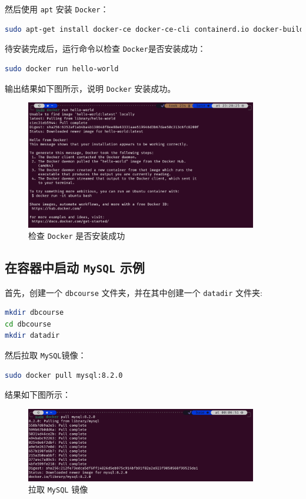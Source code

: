 \documentclass{article}
\begin{document}
然后使用 \texttt{apt} 安装 \texttt{Docker}：

\begin{lstlisting}[language=bash]
sudo apt-get install docker-ce docker-ce-cli containerd.io docker-buildx-plugin docker-compose-plugin
\end{lstlisting}

待安装完成后，运行命令以检查 \texttt{Docker}是否安装成功：

\begin{lstlisting}[language=bash]
sudo docker run hello-world
\end{lstlisting}

输出结果如下图所示，说明 \texttt{Docker} 安装成功。

\begin{figure}[H]
  \centering
  \includegraphics[width=0.9\textwidth]{img/1.png}
  \caption{检查 \texttt{Docker} 是否安装成功}
\end{figure}

\subsection{在容器中启动 \texttt{MySQL} 示例}

首先，创建一个 \texttt{dbcourse} 文件夹，并在其中创建一个 \texttt{datadir} 文件夹:

\begin{lstlisting}[language=bash]
mkdir dbcourse
cd dbcourse
mkdir datadir
\end{lstlisting}

然后拉取 \texttt{MySQL}镜像：

\begin{lstlisting}[language=bash]
sudo docker pull mysql:8.2.0
\end{lstlisting}

结果如下图所示：

\begin{figure}[H]
  \centering
  \includegraphics[width=0.9\textwidth]{img/2.png}
  \caption{拉取 \texttt{MySQL} 镜像}
\end{figure}
\end{document}
